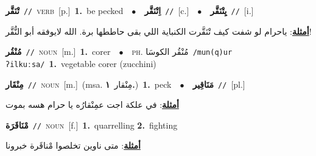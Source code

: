\documentclass[10pt,a4paper,twoside]{article} %
\begin{document}
\begin{multicols}{2}
{\setlength\topsep{0pt}\textbf{\foreignlanguage{arabic}{تْنَقَّر}}\ {\color{gray}\texttt{//}\color{black}}\ \textsc{verb}\ [p.]\ \textbf{1.}~be pecked\ \ $\bullet$\ \ \setlength\topsep{0pt}\textbf{\foreignlanguage{arabic}{اِتْنَقَّر}}\ {\color{gray}\texttt{//}\color{black}}\ [c.]\ \ $\bullet$\ \ \setlength\topsep{0pt}\textbf{\foreignlanguage{arabic}{يِتْنَقَّر}}\ {\color{gray}\texttt{//}\color{black}}\ [i.]\  \begin{flushright}\color{gray}\foreignlanguage{arabic}{\textbf{\underline{\foreignlanguage{arabic}{أمثلة}}}: ياحرام لو شفت كيف تْنَقَّرت الكنباية اللي بقى حاططها برة. الله لايوفقه أبو النُّقَّر!}\end{flushright}\color{black}} \vspace{2mm}

{\setlength\topsep{0pt}\textbf{\foreignlanguage{arabic}{مُنْقُر}}\ {\color{gray}\texttt{//}\color{black}}\ \textsc{noun}\ [m.]\ \textbf{1.}~corer\ \ $\bullet$\ \ \textsc{ph.} \color{gray} \foreignlanguage{arabic}{مُنْقُر الكوسَا}\color{black}\ {\color{gray}\texttt{/{\sffamily mun(q)ur ʔilkuːsa}/}\color{black}}\ \textbf{1.}~vegetable corer (zucchini)\ } \vspace{2mm}

{\setlength\topsep{0pt}\textbf{\foreignlanguage{arabic}{مِنْقَار}}\ {\color{gray}\texttt{//}\color{black}}\ \textsc{noun}\ [m.]\ \color{gray}(msa. \foreignlanguage{arabic}{مِنْقار}~\foreignlanguage{arabic}{\textbf{١.}})\color{black}\ \textbf{1.}~peck\ \ $\bullet$\ \ \setlength\topsep{0pt}\textbf{\foreignlanguage{arabic}{مَنَاقِير}}\ {\color{gray}\texttt{//}\color{black}}\ [pl.]\  \begin{flushright}\color{gray}\foreignlanguage{arabic}{\textbf{\underline{\foreignlanguage{arabic}{أمثلة}}}: في علكة اجت عمِنْقارُه يا حرام هسه بموت}\end{flushright}\color{black}} \vspace{2mm}

{\setlength\topsep{0pt}\textbf{\foreignlanguage{arabic}{مْنَاقَرَة}}\ {\color{gray}\texttt{//}\color{black}}\ \textsc{noun}\ [f.]\ \textbf{1.}~quarrelling  \textbf{2.}~fighting\  \begin{flushright}\color{gray}\foreignlanguage{arabic}{\textbf{\underline{\foreignlanguage{arabic}{أمثلة}}}: متى ناوين تخلصوا مْناقَرة خبرونا}\end{flushright}\color{black}} \vspace{2mm}


\end{multicols}
\end{document}
